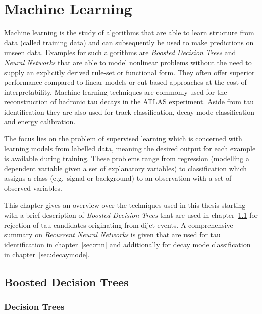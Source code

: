 \chapter{Machine Learning}
\label{sec:ml}

Machine learning is the study of algorithms that are able to learn structure
from data (called training data) and can subsequently be used to make
predictions on unseen data. Examples for such algorithms are \emph{Boosted
  Decision Trees} and \emph{Neural Networks} that are able to model nonlinear
problems without the need to supply an explicitly derived rule-set or functional
form. They often offer superior performance compared to linear models or
cut-based approaches at the cost of interpretability. Machine learning
techniques are commonly used for the reconstruction of hadronic tau decays in
the ATLAS experiment. Aside from tau identification they are also used for track
classification, decay mode classification and energy calibration.

The focus lies on the problem of supervised learning which is concerned with
learning models from labelled data, meaning the desired output for each example
is available during training. These problems range from regression (modelling a
dependent variable given a set of explanatory variables) to classification which
assigns a class (e.g.\ signal or background) to an observation with a set of
observed variables.

This chapter gives an overview over the techniques used in this thesis starting
with a brief description of \emph{Boosted Decision Trees} that are used in
chapter~\ref{sec:bdt} for rejection of tau candidates originating from dijet
events. A comprehensive summary on \emph{Recurrent Neural Networks} is given
that are used for tau identification in chapter~\ref{sec:rnn} and additionally
for decay mode classification in chapter~\ref{sec:decaymode}. 

\section{Boosted Decision Trees}
\label{sec:bdt}


\subsection{Decision Trees}
\label{sec:bdt_decision_trees}

